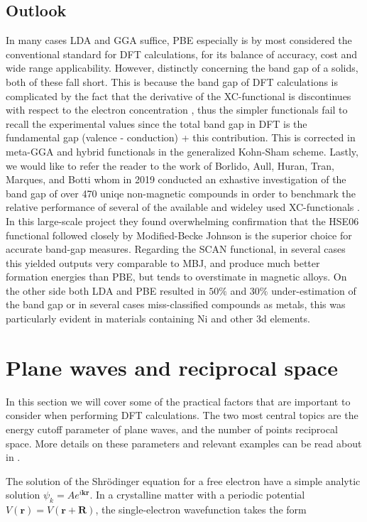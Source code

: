 \subsection{Outlook} 
 
In many cases LDA and GGA suffice, PBE especially is by most considered the conventional standard for DFT calculations, for its balance of accuracy, cost and wide range applicability. However, distinctly concerning the band gap of a solids, both of these fall short. This is because the band gap of DFT calculations is complicated by the fact that the derivative of the XC-functional is discontinues with respect to the electron concentration \cite{xc_derivative}, thus the simpler functionals fail to recall the experimental values since the total band gap in DFT is the fundamental gap (valence - conduction) + this contribution. This is corrected in meta-GGA and hybrid functionals in the generalized Kohn-Sham scheme. Lastly, we would like to refer the reader to the work of Borlido, Aull, Huran, Tran, Marques, and Botti whom in 2019 conducted an exhastive investigation of the band gap of over 470 uniqe non-magnetic compounds in order to benchmark the relative performance of several of the available and wideley used XC-functionals \cite{xc_benchmark}. In this large-scale project they found overwhelming confirmation that the HSE06 functional followed closely by Modified-Becke Johnson is the superior choice for accurate band-gap measures. Regarding the SCAN functional, in several cases this yielded outputs very comparable to MBJ, and produce much better formation energies than PBE, but tends to overstimate in magnetic alloys. On the other side both LDA and PBE resulted in $50\%$ and $30\%$ under-estimation of the band gap or in several cases miss-classified compounds as metals, this was particularly evident in materials containing Ni and other 3d elements.  
 

\section{Plane waves and reciprocal space}
In this section we will cover some of the practical factors that are important to consider when performing DFT calculations. The two most central topics are the energy cutoff parameter of plane waves, and the number of points reciprocal space. More details on these parameters and relevant examples can be read about in \cite{Sholl2009}. 
 
The solution of the Shr\"{o}dinger equation for a free electron have a simple analytic solution $\psi_k = Ae^{i\boldsymbol{k}\boldsymbol{r}}$. In a crystalline matter with a periodic potential $V(\boldsymbol{r}) = V(\boldsymbol{r} + \boldsymbol{R})$, the single-electron wavefunction takes the form 

